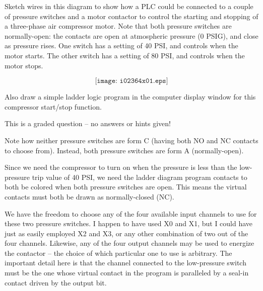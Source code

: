 

Sketch wires in this diagram to show how a PLC could be connected to a couple of pressure switches and a motor contactor to control the starting and stopping of a three-phase air compressor motor.  Note that both pressure switches are normally-open: the contacts are open at atmospheric pressure (0 PSIG), and close as pressure rises.  One switch has a setting of 40 PSI, and controls when the motor starts.  The other switch has a setting of 80 PSI, and controls when the motor stops.

$$\texttt{[image: i02364x01.eps]}$$

Also draw a simple ladder logic program in the computer display window for this compressor start/stop function.

\vfil

\eject






This is a graded question -- no answers or hints given!







Note how neither pressure switches are form C (having both NO and NC contacts to choose from).  Instead, both pressure switches are form A (normally-open).

\vskip 10pt

Since we need the compressor to turn on when the pressure is less than the low-pressure trip value of 40 PSI, we need the ladder diagram program contacts to both be colored when both pressure switches are open.  This means the virtual contacts must both be drawn as normally-closed (NC).

We have the freedom to choose any of the four available input channels to use for these two pressure switches.  I happen to have used X0 and X1, but I could have just as easily employed X2 and X3, or any other combination of two out of the four channels.  Likewise, any of the four output channels may be used to energize the contactor -- the choice of which particular one to use is arbitrary.  The important detail here is that the channel connected to the low-pressure switch must be the one whose virtual contact in the program is paralleled by a seal-in contact driven by the output bit.

